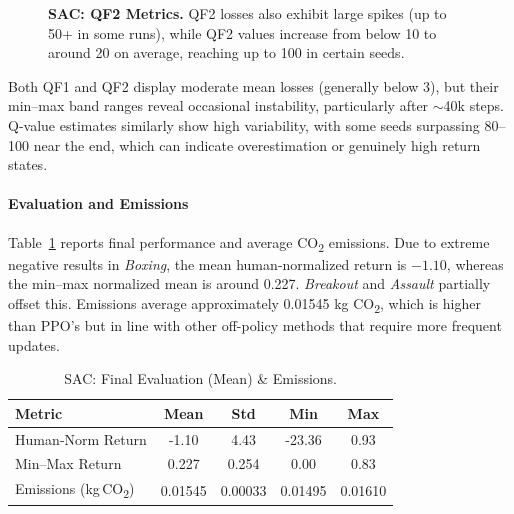 \begin{figure}
	\centering
	\quad
	\caption{\textbf{SAC: QF2 Metrics.} QF2 losses also exhibit large spikes (up to 50+ in some runs), while QF2 values increase from below 10 to around 20 on average, reaching up to 100 in certain seeds.}
	\label{fig:sac_q_metrics_2}
\end{figure}

\noindent
Both QF1 and QF2 display moderate mean losses (generally below 3), but their min–max band ranges reveal occasional instability, particularly after \(\sim\)40k steps. Q-value estimates similarly show high variability, with some seeds surpassing 80–100 near the end, which can indicate overestimation or genuinely high return states.

\paragraph{Evaluation and Emissions}
Table~\ref{tab:sac_eval} reports final performance and average CO\textsubscript{2} emissions. Due to extreme negative results in \emph{Boxing}, the mean human‐normalized return is \(-1.10\), whereas the min–max normalized mean is around 0.227. \emph{Breakout} and \emph{Assault} partially offset this. Emissions average approximately 0.01545 kg CO\textsubscript{2}, which is higher than PPO's but in line with other off-policy methods that require more frequent updates.

\begin{table}
	\centering
	\caption{SAC: Final Evaluation (Mean) \& Emissions.}
	\label{tab:sac_eval}
	\begin{tabular}{lcccc}
		\toprule
		\textbf{Metric} & \textbf{Mean} & \textbf{Std} & \textbf{Min} & \textbf{Max} \\
		\midrule
		Human‐Norm Return & -1.10 & 4.43 & -23.36 & 0.93 \\
		Min–Max Return   & 0.227 & 0.254 & 0.00   & 0.83 \\
		Emissions (kg\,CO\textsubscript{2}) & 0.01545 & 0.00033 & 0.01495 & 0.01610 \\
		\bottomrule
	\end{tabular}
\end{table}

